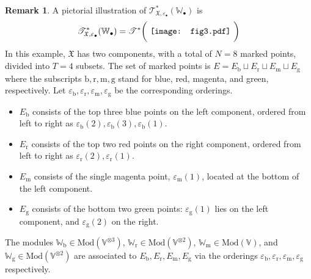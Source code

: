 \documentclass[11pt,b5paper,notitlepage]{article}
\theoremstyle{definition}
\newtheorem{rem}[df]{Remark}
\theoremstyle{plain}
\newcommand{\blt}{\bullet}
\newcommand{\Vbb}{\mathbb V}
\newcommand{\Wbb}{\mathbb W}
\newcommand{\<}{\left\langle}
\renewcommand{\>}{\right\rangle}
\newcommand{\fx}{\mathfrak{X}}
\newcommand{\ST}{\mathscr{T}}
\newcommand{\Mod}{\mathrm{Mod}}
\newcommand{\eps}{\varepsilon}
\numberwithin{equation}{section}
\begin{document}
\begin{rem}\label{lb33}
A pictorial illustration of $\ST^*_{\fx,\eps_\blt}(\Wbb_\blt)$ is
\begin{align*}
\ST^*_{\fx,\eps_\blt}(\Wbb_\blt)=\ST^*\bigg(\vcenter{\hbox{{
		 \texttt{[image: fig3.pdf]}}}}~  \bigg)
\end{align*}
In this example, $\fx$ has two components, with a total of $N=8$ marked points, divided into $T=4$ subsets. The set of marked points is $E=E_{\mathrm b}\sqcup E_{\mathrm r}\sqcup E_{\mathrm m}\sqcup E_{\mathrm g}$ where the subscripts $\mathrm b,\mathrm r,\mathrm m,\mathrm g$ stand for blue, red, magenta, and green, respectively. Let $\eps_{\mathrm b},\eps_{\mathrm r},\eps_{\mathrm m},\eps_{\mathrm g}$ be the corresponding orderings.
\begin{itemize}
\item $E_{\mathrm b}$ consists of the top three blue points on the left component, ordered from left to right as $\eps_{\mathrm b}(2),\eps_{\mathrm b}(3),\eps_{\mathrm b}(1)$.
\item  $E_{\mathrm r}$ consists of the top two red points on the right component, ordered from left to right as $\eps_{\mathrm r}(2),\eps_{\mathrm r}(1)$.
\item $E_{\mathrm m}$ consists of the single magenta point, $\eps_{\mathrm m}(1)$, located at the bottom of the left component.
\item $E_{\mathrm g}$ consists of the bottom two green points: $\eps_{\mathrm g}(1)$ lies on the left component, and $\eps_{\mathrm g}(2)$ on the right.
\end{itemize}
The modules $\Wbb_{\mathrm b}\in\Mod(\Vbb^{\otimes 3})$, $\Wbb_{\mathrm r}\in\Mod(\Vbb^{\otimes 2})$, $\Wbb_{\mathrm m}\in\Mod(\Vbb)$, and $\Wbb_{\mathrm g}\in\Mod(\Vbb^{\otimes 2})$ are associated to $E_{\mathrm b},E_{\mathrm r},E_{\mathrm m},E_{\mathrm g}$ via the orderings $\eps_{\mathrm b},\eps_{\mathrm r},\eps_{\mathrm m},\eps_{\mathrm g}$ respectively. 
\end{rem}
\end{document}
